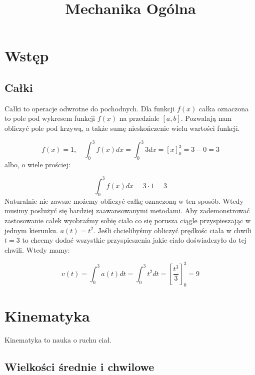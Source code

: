 \documentclass{../notatki}
\title{Mechanika Ogólna}
\begin{document}
\tableofcontents

\setcounter{section}{-1}

\section{Wstęp}

\subsection{Całki}

Całki to operacje odwrotne do pochodnych. Dla funkcji $f(x)$ całka oznaczona
to pole pod wykresem funkcji $f(x)$ na przedziale $[a, b]$. Pozwalają nam
obliczyć pole pod krzywą, a także sumę nieskończenie wielu wartości funkcji.

\begin{figure*}[h]
  \centering
\end{figure*}

$$
f(x) = 1, \quad \int_0^3 f(x) dx = \int_0^3 3 dx =\left[x\right]^3_0 = 3 - 0 = 3
$$
albo, o wiele prościej:

$$
\int_0^3 f(x) dx = 3 \cdot 1 = 3
$$
Naturalnie nie zawsze możemy obliczyć całkę oznaczoną w ten sposób. Wtedy
musimy posłużyć się bardziej zaawansowanymi metodami.
Aby zademonstrować zastosowanie całek wyobraźmy sobię ciało co się porusza
ciągle przyspieszając w jednym kierunku. $a(t) = t^2$. Jeśli chcielibyśmy
obliczyć prędkośc ciała w chwili $t = 3$ to chcemy dodać wszystkie
przyspieszenia
jakie ciało doświadczyło do tej chwili. Wtedy mamy:

$$
v(t) = \int^3_0 a(t) dt = \int^3_0 t^2 dt = \left[\frac{t^3}{3}\right]^3_0 = 9
$$

\section{Kinematyka}

Kinematyka to nauka o ruchu ciał.

\subsection{Wielkości średnie i chwilowe}
\end{document}
